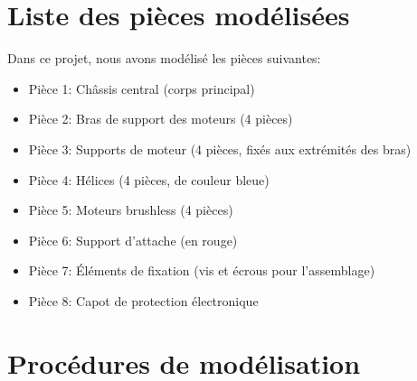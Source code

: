 \documentclass[a4paper,12pt]{report}
\begin{document}
\section{Liste des pièces modélisées}
Dans ce projet, nous avons modélisé les pièces suivantes:
\begin{itemize}
    \item Pièce 1: Châssis central (corps principal)
    \item Pièce 2: Bras de support des moteurs (4 pièces)
    \item Pièce 3: Supports de moteur (4 pièces, fixés aux extrémités des bras)
    \item Pièce 4: Hélices (4 pièces, de couleur bleue)
    \item Pièce 5: Moteurs brushless (4 pièces)
    \item Pièce 6: Support d'attache (en rouge)
    \item Pièce 7: Éléments de fixation (vis et écrous pour l'assemblage)
    \item Pièce 8: Capot de protection électronique
\end{itemize}

\section{Procédures de modélisation}
\end{document}
